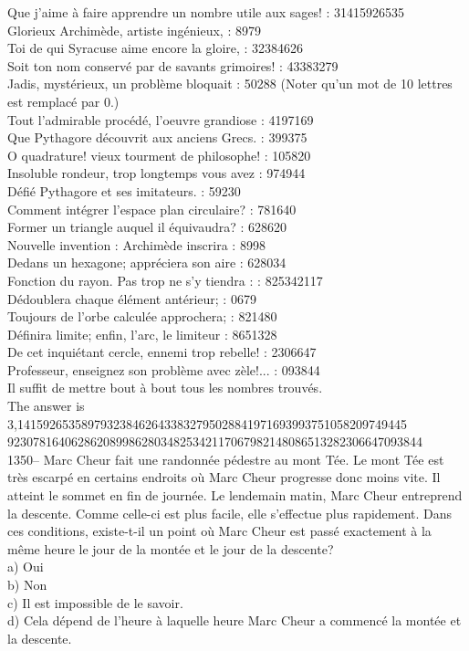 ﻿\documentclass[letterpaper, 12pt]{article}
\begin{document}
Que j'aime \`a faire apprendre un nombre utile aux sages! : 31415926535\\
Glorieux Archim\`ede, artiste ing\'enieux, : 8979\\
Toi de qui Syracuse aime encore la gloire, : 32384626\\
Soit ton nom conserv\'e par de savants grimoires! : 43383279\\
Jadis, myst\'erieux, un probl\`eme bloquait : 50288  (Noter qu'un mot de 10
lettres est remplac\'e par 0.)\\
Tout l'admirable proc\'ed\'e, l'oeuvre grandiose : 4197169\\
Que Pythagore d\'ecouvrit aux anciens Grecs. : 399375\\
O quadrature! vieux tourment de philosophe! : 105820\\
Insoluble rondeur, trop longtemps vous avez : 974944\\
D\'efi\'e Pythagore et ses imitateurs. : 59230\\
Comment int\'egrer l'espace plan circulaire? : 781640\\
Former un triangle auquel il \'equivaudra? : 628620\\
Nouvelle invention : Archim\`ede inscrira : 8998\\
Dedans un hexagone; appr\'eciera son aire : 628034\\
Fonction du rayon. Pas trop ne s'y tiendra : : 825342117\\
D\'edoublera chaque \'el\'ement ant\'erieur; : 0679\\
Toujours de l'orbe calcul\'ee approchera; : 821480\\
D\'efinira limite; enfin, l'arc, le limiteur : 8651328\\
De cet inqui\'etant cercle, ennemi trop rebelle! : 2306647\\
Professeur, enseignez son probl\`eme avec z\`ele!... : 093844\\

Il suffit de mettre bout \`a bout tous les nombres trouv\'es.\\

The answer is\\
3,1415926535897932384626433832795028841971693993751058209749445\\
92307816406286208998628034825342117067982148086513282306647093844\\

1350-- Marc Cheur fait une randonn\'ee p\'edestre au mont T\'ee.  Le mont
T\'ee est tr\`es escarp\'e en certains endroits o\`u Marc Cheur progresse
donc moins vite.  Il atteint le sommet en fin de journ\'ee.  Le lendemain
matin, Marc Cheur entreprend la descente.  Comme celle-ci est plus facile,
elle s'effectue plus rapidement.  Dans ces conditions, existe-t-il un point
o\`u Marc Cheur est pass\'e exactement \`a la m\^eme heure le jour de la
mont\'ee et le jour de la descente?\\
a) Oui\\
b) Non\\
c) Il est impossible de le savoir.\\
d) Cela d\'epend de l'heure \`a laquelle heure Marc Cheur a commenc\'e la
mont\'ee et la descente.\\
\end{document}
